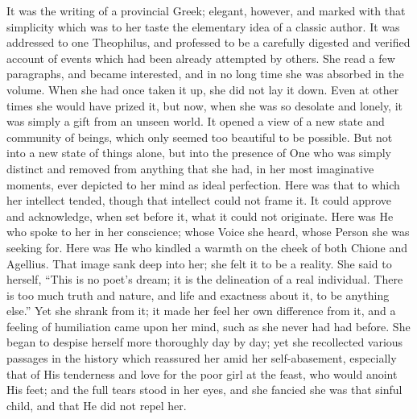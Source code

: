 It was the writing of a provincial Greek; elegant, however, and
marked with that simplicity which was to her taste the elementary idea
of a classic author. It was addressed to one Theophilus, and professed
to be a carefully digested and verified account of events which had
been already attempted by others. She read a few paragraphs, and
became interested, and in no long time she was absorbed in the volume.
When she had once taken it up, she did not lay it down. Even at other
times she would have prized it, but now, when she was so desolate and
lonely, it was simply a gift from an unseen world. It opened a
view of a new state and community of beings, which only seemed too
beautiful to be possible. But not into a new state of things alone,
but into the presence of One who was simply distinct and removed from
anything that she had, in her most imaginative moments, ever depicted
to her mind as ideal perfection. Here was that to which her intellect
tended, though that intellect could not frame it. It could approve and
acknowledge, when set before it, what it could not originate. Here was
He who spoke to her in her conscience; whose Voice she heard, whose
Person she was seeking for. Here was He who kindled a warmth on the
cheek of both Chione and Agellius. That image sank deep into her; she
felt it to be a reality. She said to herself, ``This is no poet's
dream; it is the delineation of a real individual. There is too much
truth and nature, and life and exactness about it, to be anything
else.'' Yet she shrank from it; it made her feel her own
difference from it, and a feeling of humiliation came upon her mind,
such as she never had had before. She began to despise herself more
thoroughly day by day; yet she recollected various passages in the
history which reassured her amid her self-abasement, especially that
of His tenderness and love for the poor girl at the feast, who would
anoint His feet; and the full tears stood in her eyes, and she fancied
she was that sinful child, and that He did not repel her.

